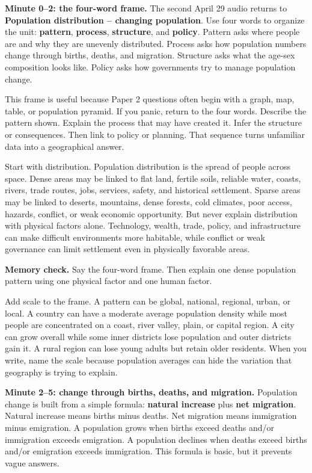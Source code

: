 \documentclass[11pt,a4paper]{article}
\newcommand{\term}[1]{\textcolor{HeadingBlue}{\textbf{#1}}}
\begin{document}
\textbf{Minute 0--2: the four-word frame.}
The second April 29 audio returns to \term{Population distribution -- changing
population}. Use four words to organize the unit:
\term{pattern}, \term{process}, \term{structure}, and \term{policy}. Pattern
asks where people are and why they are unevenly distributed. Process asks how
population numbers change through births, deaths, and migration. Structure asks
what the age-sex composition looks like. Policy asks how governments try to
manage population change.

This frame is useful because Paper 2 questions often begin with a graph, map,
table, or population pyramid. If you panic, return to the four words. Describe
the pattern shown. Explain the process that may have created it. Infer the
structure or consequences. Then link to policy or planning. That sequence turns
unfamiliar data into a geographical answer.

Start with distribution. Population distribution is the spread of people across
space. Dense areas may be linked to flat land, fertile soils, reliable water,
coasts, rivers, trade routes, jobs, services, safety, and historical settlement.
Sparse areas may be linked to deserts, mountains, dense forests, cold climates,
poor access, hazards, conflict, or weak economic opportunity. But never explain
distribution with physical factors alone. Technology, wealth, trade, policy,
and infrastructure can make difficult environments more habitable, while
conflict or weak governance can limit settlement even in physically favorable
areas.

\textbf{Memory check.} Say the four-word frame. Then explain one dense
population pattern using one physical factor and one human factor.

Add scale to the frame. A pattern can be global, national, regional, urban, or
local. A country can have a moderate average population density while most
people are concentrated on a coast, river valley, plain, or capital region. A
city can grow overall while some inner districts lose population and outer
districts gain it. A rural region can lose young adults but retain older
residents. When you write, name the scale because population averages can hide
the variation that geography is trying to explain.

\textbf{Minute 2--5: change through births, deaths, and migration.}
Population change is built from a simple formula: \term{natural increase} plus
\term{net migration}. Natural increase means births minus deaths. Net migration
means immigration minus emigration. A population grows when births exceed deaths
and/or immigration exceeds emigration. A population declines when deaths exceed
births and/or emigration exceeds immigration. This formula is basic, but it
prevents vague answers.
\end{document}
